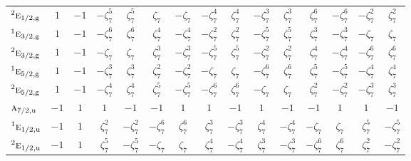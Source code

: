 \documentclass[10pt,a4paper]{article}
\numberwithin{equation}{section}
\newcommand{\irr}[1]{\text{\normalfont\scshape #1}}
\newcommand{\conjpair}[1]{{}^{#1}}
\newcommand{\ptag}[1]{\mathrm{#1}}
\newcommand{\rootunity}[1]{\zeta_{#1}}
\begin{document}
{\begin{longtable}{@{}lcccccccccccccc@{}}
$\conjpair{2}\irr{e}_{1/2,\ptag{g}}$ & $1$ & $-1$ & $-\rootunity{7}^{5}$ & $\rootunity{7}^{5}$ & $\rootunity{7}$ & $-\rootunity{7}$ & $-\rootunity{7}^{4}$ & $\rootunity{7}^{4}$ & $-\rootunity{7}^{3}$ & $\rootunity{7}^{3}$ & $\rootunity{7}^{6}$ & $-\rootunity{7}^{6}$ & $-\rootunity{7}^{2}$ & $\rootunity{7}^{2}$\\
$\conjpair{1}\irr{e}_{3/2,\ptag{g}}$ & $1$ & $-1$ & $-\rootunity{7}^{6}$ & $\rootunity{7}^{6}$ & $\rootunity{7}^{4}$ & $-\rootunity{7}^{4}$ & $-\rootunity{7}^{2}$ & $\rootunity{7}^{2}$ & $-\rootunity{7}^{5}$ & $\rootunity{7}^{5}$ & $\rootunity{7}^{3}$ & $-\rootunity{7}^{3}$ & $-\rootunity{7}$ & $\rootunity{7}$\\
$\conjpair{2}\irr{e}_{3/2,\ptag{g}}$ & $1$ & $-1$ & $-\rootunity{7}$ & $\rootunity{7}$ & $\rootunity{7}^{3}$ & $-\rootunity{7}^{3}$ & $-\rootunity{7}^{5}$ & $\rootunity{7}^{5}$ & $-\rootunity{7}^{2}$ & $\rootunity{7}^{2}$ & $\rootunity{7}^{4}$ & $-\rootunity{7}^{4}$ & $-\rootunity{7}^{6}$ & $\rootunity{7}^{6}$\\
$\conjpair{1}\irr{e}_{5/2,\ptag{g}}$ & $1$ & $-1$ & $-\rootunity{7}^{3}$ & $\rootunity{7}^{3}$ & $\rootunity{7}^{2}$ & $-\rootunity{7}^{2}$ & $-\rootunity{7}$ & $\rootunity{7}$ & $-\rootunity{7}^{6}$ & $\rootunity{7}^{6}$ & $\rootunity{7}^{5}$ & $-\rootunity{7}^{5}$ & $-\rootunity{7}^{4}$ & $\rootunity{7}^{4}$\\
$\conjpair{2}\irr{e}_{5/2,\ptag{g}}$ & $1$ & $-1$ & $-\rootunity{7}^{4}$ & $\rootunity{7}^{4}$ & $\rootunity{7}^{5}$ & $-\rootunity{7}^{5}$ & $-\rootunity{7}^{6}$ & $\rootunity{7}^{6}$ & $-\rootunity{7}$ & $\rootunity{7}$ & $\rootunity{7}^{2}$ & $-\rootunity{7}^{2}$ & $-\rootunity{7}^{3}$ & $\rootunity{7}^{3}$\\
$\irr{a}_{7/2,\ptag{u}}$ & $-1$ & $1$ & $1$ & $-1$ & $-1$ & $1$ & $1$ & $-1$ & $1$ & $-1$ & $-1$ & $1$ & $1$ & $-1$\\
$\conjpair{1}\irr{e}_{1/2,\ptag{u}}$ & $-1$ & $1$ & $\rootunity{7}^{2}$ & $-\rootunity{7}^{2}$ & $-\rootunity{7}^{6}$ & $\rootunity{7}^{6}$ & $\rootunity{7}^{3}$ & $-\rootunity{7}^{3}$ & $\rootunity{7}^{4}$ & $-\rootunity{7}^{4}$ & $-\rootunity{7}$ & $\rootunity{7}$ & $\rootunity{7}^{5}$ & $-\rootunity{7}^{5}$\\
$\conjpair{2}\irr{e}_{1/2,\ptag{u}}$ & $-1$ & $1$ & $\rootunity{7}^{5}$ & $-\rootunity{7}^{5}$ & $-\rootunity{7}$ & $\rootunity{7}$ & $\rootunity{7}^{4}$ & $-\rootunity{7}^{4}$ & $\rootunity{7}^{3}$ & $-\rootunity{7}^{3}$ & $-\rootunity{7}^{6}$ & $\rootunity{7}^{6}$ & $\rootunity{7}^{2}$ & $-\rootunity{7}^{2}$\\

\end{longtable}}
\end{document}
